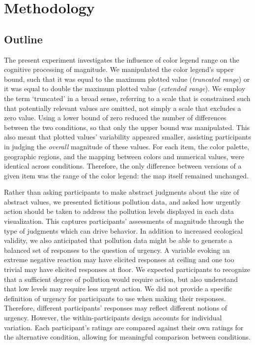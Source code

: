 \documentclass[
]{interact}
\begin{document}
\hypertarget{methodology}{%
\section{Methodology}\label{methodology}}

\hypertarget{outline}{%
\subsection{Outline}\label{outline}}

The present experiment investigates the influence of color legend range
on the cognitive processing of magnitude. We manipulated the color
legend's upper bound, such that it was equal to the maximum plotted
value (\emph{truncated range}) or it was equal to double the maximum
plotted value (\emph{extended range}). We employ the term `truncated' in
a broad sense, referring to a scale that is constrained such that
potentially relevant values are omitted, not simply a scale that
excludes a zero value. Using a lower bound of zero reduced the number of
differences between the two conditions, so that only the upper bound was
manipulated. This also meant that plotted values' variability appeared
smaller, assisting participants in judging the \emph{overall} magnitude
of these values. For each item, the color palette, geographic regions,
and the mapping between colors and numerical values, were identical
across conditions. Therefore, the only difference between versions of a
given item was the range of the color legend: the map itself remained
unchanged.

Rather than asking participants to make abstract judgments about the
size of abstract values, we presented fictitious pollution data, and
asked how urgently action should be taken to address the pollution
levels displayed in each data visualization. This captures participants'
assessments of magnitude through the type of judgments which can drive
behavior. In addition to increased ecological validity, we also
anticipated that pollution data might be able to generate a balanced set
of responses to the question of urgency. A variable evoking an extreme
negative reaction may have elicited responses at ceiling and one too
trivial may have elicited responses at floor. We expected participants
to recognize that a sufficient degree of pollution would require action,
but also understand that low levels may require less urgent action. We
did not provide a specific definition of urgency for participants to use
when making their responses. Therefore, different participants'
responses may reflect different notions of urgency. However, the
within-participants design accounts for individual variation. Each
participant's ratings are compared against their own ratings for the
alternative condition, allowing for meaningful comparison between
conditions.
\end{document}
